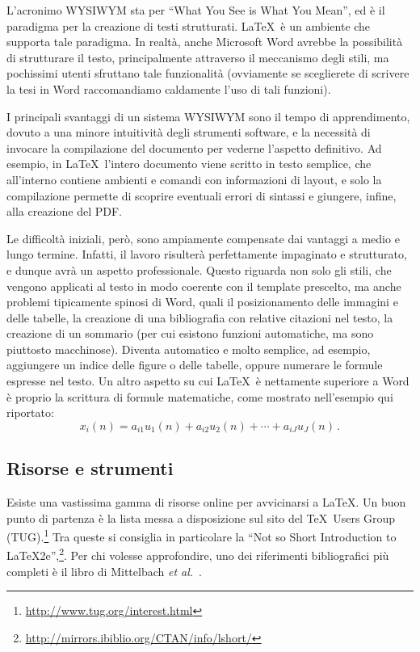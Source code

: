 \documentclass[12pt]{report}
\begin{document}
L'acronimo WYSIWYM sta per ``What You See is What You Mean'', ed è il paradigma per la creazione di testi strutturati. \LaTeX\ è un ambiente che supporta tale paradigma. In realtà, anche Microsoft Word avrebbe la possibilità di strutturare il testo, principalmente attraverso il meccanismo degli stili, ma pochissimi utenti sfruttano tale funzionalità (ovviamente se sceglierete di scrivere la tesi in Word raccomandiamo caldamente l'uso di tali funzioni).

I principali svantaggi di un sistema WYSIWYM sono il tempo di apprendimento, dovuto a una minore intuitività degli strumenti software, e la necessità di invocare la compilazione del documento per vederne l'aspetto definitivo. Ad esempio, in \LaTeX\ l'intero documento viene scritto in testo semplice, che all'interno contiene ambienti e comandi con informazioni di layout, e solo la compilazione permette di scoprire eventuali errori di sintassi e giungere, infine, alla creazione del PDF. 

Le difficoltà iniziali, però, sono ampiamente compensate dai vantaggi a medio e lungo termine. Infatti, il lavoro risulterà perfettamente impaginato e strutturato, e dunque avrà un aspetto professionale. Questo riguarda non solo gli stili, che vengono applicati al testo in modo coerente con il template prescelto, ma anche problemi tipicamente spinosi di Word, quali il posizionamento delle immagini e delle tabelle, la creazione di una bibliografia con relative citazioni nel testo, la creazione di un sommario (per cui esistono funzioni automatiche, ma sono piuttosto macchinose). Diventa automatico e molto semplice, ad esempio, aggiungere un indice delle figure o delle tabelle, oppure numerare le formule espresse nel testo. Un altro aspetto su cui \LaTeX\ è nettamente superiore a Word è proprio la scrittura di formule matematiche, come mostrato nell'esempio qui riportato:
\begin{equation}
x_i(n) = a_{i1}u_1(n) + a_{i2}u_2(n) + \cdots + a_{iJ}u_J(n) \, .
\label{eq:multimix}
\end{equation}

\subsection{Risorse e strumenti}

Esiste una vastissima gamma di risorse online per avvicinarsi a \LaTeX. Un buon punto di partenza \`e la lista messa a disposizione sul sito del \TeX\ Users Group (TUG).\footnote{\url{http://www.tug.org/interest.html}}
Tra queste si consiglia in particolare la ``Not so Short Introduction to LaTeX2e'',\footnote{\url{http://mirrors.ibiblio.org/CTAN/info/lshort/}}. Per chi volesse approfondire, uno dei riferimenti bibliografici pi\`u completi \`e il libro di Mittelbach {\em et al.}~\cite{mittelbach2004latex}.
\end{document}
